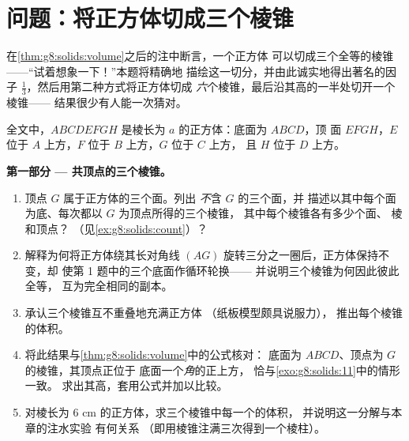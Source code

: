 \section{问题：将正方体切成三个棱锥}

\begin{problem}
\label{pb:g8:solids:1}
在\cref{thm:g8:solids:volume}之后的注中断言，一个正方体
可以切成三个全等的棱锥——“试着想象一下！”本题将精确地
描绘这一切分，并由此诚实地得出著名的因子
$\frac13$，然后用第二种方式将正方体切成
\emph{六}个棱锥，最后沿其高的一半处切开一个棱锥——
结果很少有人能一次猜对。

全文中，$ABCDEFGH$ 是棱长为 $a$ 的正方体：底面为 $ABCD$，顶
面 $EFGH$，$E$ 位于 $A$ 上方，$F$ 位于 $B$ 上方，$G$ 位于 $C$ 上方，
且 $H$ 位于 $D$ 上方。

\medskip
\noindent\textbf{第一部分 --- 共顶点的三个棱锥。}
\begin{enumerate}
  \item 顶点 $G$ 属于正方体的三个面。列出
        \emph{不}含 $G$ 的三个面，并
        描述以其中每个面为底、每次都以 $G$ 为顶点所得的三个棱锥，
        其中每个棱锥各有多少个面、
        棱和顶点？
        （见\cref{ex:g8:solids:count}）？
  \item 解释为何将正方体绕其长对角线
        $(AG)$ 旋转三分之一圈后，正方体保持不变，却
        使第 1 题中的三个底面作循环轮换——
        并说明三个棱锥为何因此彼此全等，
        互为完全相同的副本。
  \item 承认三个棱锥互不重叠地充满正方体
        （纸板模型颇具说服力），
        推出每个棱锥的体积。
  \item 将此结果与\cref{thm:g8:solids:volume}中的公式核对：
        底面为 $ABCD$、顶点为 $G$ 的棱锥，其顶点正位于
        底面一个\emph{角}的正上方，
        恰与\cref{exo:g8:solids:11}中的情形一致。
        求出其高，套用公式并加以比较。
  \item 对棱长为 $6$ cm 的正方体，求三个棱锥中每一个的体积，
        并说明这一分解与本章的注水实验
        有何关系
        （即用棱锥注满三次得到一个棱柱）。
\end{enumerate}


\end{problem}
